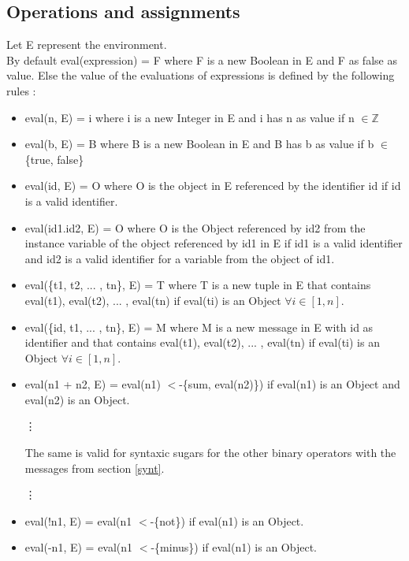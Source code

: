 \documentclass{eplDoc}
\begin{document}
\subsection{Operations and assignments}
Let E represent the environment. \\ 
By default eval(expression) = F where F is a new Boolean in E and F as false as value. Else the value of the evaluations of expressions is defined by the following rules : 
\begin{itemize}
\item eval(n, E) = i where i is a new Integer in E and i has n as value if n $\in \mathbb{Z}$ 

\item eval(b, E) = B where B is a new Boolean in E and B has b as value if b $\in$ \{true, false\} 

\item eval(id, E) = O where O is the object in E referenced by the identifier id if id is a valid identifier.

\item eval(id1.id2, E) = O where O is the Object referenced by id2 from the instance variable of the object referenced by id1 in E if id1 is a valid identifier and id2 is a valid identifier for a variable from the object of id1. 

\item eval(\{t1, t2, ... , tn\}, E) = T where T is a new tuple in E that contains eval(t1), eval(t2), ... , eval(tn) if eval(ti) is an Object $\forall i \in [1,n]$. 

\item eval(\{id, t1, ... , tn\}, E) = M where M is a new message in E with id as identifier and that contains eval(t1), eval(t2), ... , eval(tn) if eval(ti) is an Object $\forall i \in [1,n]$. 

\item eval(n1 + n2, E) = eval(n1) $<$-\{sum, eval(n2)\}) if eval(n1) is an Object and eval(n2) is an Object. \\
\begin{center}
\vdots  \\
\end{center}
 
The same is valid for syntaxic sugars for the other binary operators with the messages from section \ref{synt}.                      
\begin{center}
\vdots \\
\end{center}
  
\item eval(!n1, E) = eval(n1 $<$-\{not\}) if eval(n1) is an Object. 
\item eval(-n1, E) = eval(n1 $<$-\{minus\}) if eval(n1) is an Object. 

\end{itemize}
\end{document}
